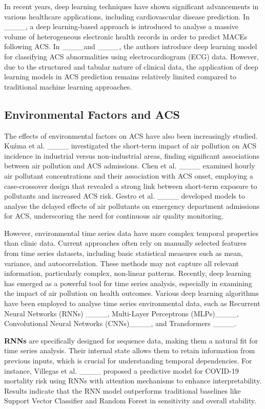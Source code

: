 In recent years, deep learning techniques have shown significant advancements in various healthcare applications, including cardiovascular disease prediction. In ____, a deep learning-based approach is introduced to analyse a massive volume of heterogeneous electronic health records in order to predict MACEs following ACS. In ____and ____, the authors introduce deep learning model for classifying ACS abnormalities using electrocardiogram (ECG) data. However, due to the structured and tabular nature of clinical data, the application of deep learning models in ACS prediction remains relatively limited compared to traditional machine learning approaches.




\subsection{Environmental Factors and ACS}


The effects of environmental factors on ACS have also been increasingly studied. Ku\'{z}ma et al. ____ investigated the short-term impact of air pollution on ACS incidence in industrial versus non-industrial areas, finding significant associations between air pollution and ACS admissions. Chen et al. ____ examined hourly air pollutant concentrations and their association with ACS onset, employing a case-crossover design that revealed a strong link between short-term exposure to pollutants and increased ACS risk. Gestro et al. ____ developed models to analyse the delayed effects of air pollutants on emergency department admissions for ACS, underscoring the need for continuous air quality monitoring.

However, environmental time series data have more complex temporal properties than clinic data.  Current approaches often rely on manually selected features from time series datasets, including basic statistical measures such as mean, variance, and autocorrelation. These methods may not capture all relevant information, particularly complex, non-linear patterns. Recently, deep learning has emerged as a powerful tool for time series analysis, especially in examining the impact of air pollution on health outcomes. Various deep learning algorithms have been employed to analyse time series environmental data, such as Recurrent Neural Networks (RNNs) ____, Multi-Layer Perceptrons (MLPs)____, Convolutional Neural Networks (CNNs)____, and Transformers ____.


\textbf{RNNs} are specifically designed for sequence data, making them a natural fit for time series analysis. Their internal state allows them to retain information from previous inputs, which is crucial for understanding temporal dependencies. For instance, Villegas et al. ____ proposed a predictive model for COVID-19 mortality risk using RNNs with attention mechanisms to enhance interpretability. Results indicate that the RNN model outperforms traditional baselines like Support Vector Classifier and Random Forest in sensitivity and overall stability.  

